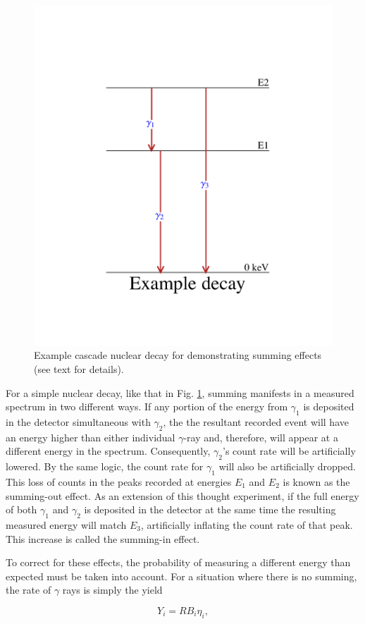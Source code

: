 \begin{figure}
\centering
\includegraphics[width=0.7\linewidth]{figures/simpleScheme.pdf}
\caption{Example cascade nuclear decay for demonstrating summing effects (see text for details). }
\label{fig: simpleDecay}
\end{figure}

For a simple nuclear decay, like that in Fig. \ref{fig: simpleDecay}, summing manifests in a measured spectrum in two different ways. If any portion of the energy from $\gamma_{1}$ is deposited in the detector simultaneous with $\gamma_{2}$, the the resultant recorded event will have an energy higher than either individual $\gamma$-ray and, therefore, will appear at a different energy in the spectrum. Consequently, $\gamma_{2}$'s count rate will be artificially lowered. By the same logic, the count rate for $\gamma_{1}$ will also be artificially dropped. This loss of counts in the peaks recorded at energies $E_{1}$ and $E_{2}$ is known as the summing-out effect. As an extension of this thought experiment, if the full energy of both $\gamma_{1}$ and $\gamma_{2}$ is deposited in the detector at the same time the resulting measured energy will match $E_{3}$, artificially inflating the count rate of that peak. This increase is called the summing-in effect.

To correct for these effects, the probability of measuring a different energy than expected must be taken into account. For a situation where there is no summing, the rate of $\gamma$ rays is simply the yield

\begin{equation}
Y_{i} = R B_{i} \eta_{i},
\end{equation}


